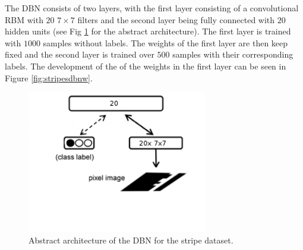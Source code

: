 The DBN consists of two layers, with the first layer consisting of a convolutional RBM with $20$ $7 \times 7$ filters and the second layer being fully connected with $20$ hidden units (see Fig \ref{fig:dbnstrarch} for the abstract architecture).
The first layer is trained with $1000$ samples without labels.
The weights of the first layer are then keep fixed and the second layer is trained over $500$ samples with their corresponding labels.
The development of the of the weights in the first layer can be seen in Figure \ref{fig:stripesdbnw}.

\begin{figure}[h!]
	\centering
    	\includegraphics[width=0.7\textwidth]{imgs/dbn_stripe.png} 
    \caption{Abstract architecture of the DBN for the stripe dataset.}
	\label{fig:dbnstrarch}
\end{figure}


